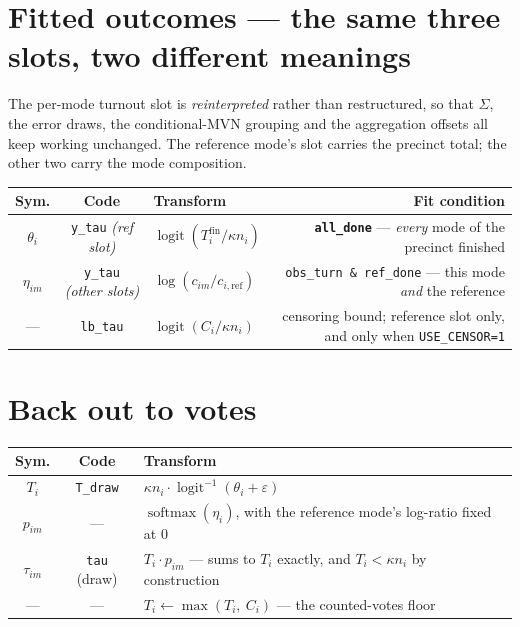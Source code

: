 \documentclass[11pt]{article}
\newcommand{\var}[1]{\texttt{\footnotesize #1}}
\newcommand{\logit}{\operatorname{logit}}
\newcommand{\softmax}{\operatorname{softmax}}
\newcommand{\refm}{\mathrm{ref}}
\begin{document}
\section{Fitted outcomes --- the same three slots, two different meanings}

The per-mode turnout slot is \emph{reinterpreted} rather than restructured, so that
$\Sigma$, the error draws, the conditional-MVN grouping and the aggregation offsets all
keep working unchanged. The reference mode's slot carries the precinct total; the other
two carry the mode composition.

\begin{center}\footnotesize
\begin{tabular}{@{}SCTR@{}}
\toprule
\textbf{Sym.} & \textbf{Code} & \textbf{Transform} & \textbf{Fit condition} \\
\midrule
$\theta_i$ & \var{y\_tau} \emph{(ref slot)} &
  $\logit\!\left(T^{\text{fin}}_i / \kappa n_i\right)$ &
  \textbf{\var{all\_done}} --- \emph{every} mode of the precinct finished \\[6pt]
$\eta_{im}$ & \var{y\_tau} \emph{(other slots)} &
  $\log\!\left(c_{im} \big/ c_{i,\refm}\right)$ &
  \var{obs\_turn \& ref\_done} --- this mode \emph{and} the reference \\[6pt]
--- & \var{lb\_tau} & $\logit\!\left(C_i / \kappa n_i\right)$ &
  censoring bound; reference slot only, and only when \var{USE\_CENSOR=1} \\
\bottomrule
\end{tabular}
\end{center}

\section{Back out to votes}

\begin{center}\footnotesize
\begin{tabular}{@{}SCT@{}}
\toprule
\textbf{Sym.} & \textbf{Code} & \textbf{Transform} \\
\midrule
$T_i$ & \var{T\_draw} & $\kappa n_i \cdot \logit^{-1}(\theta_i + \varepsilon)$ \\[4pt]
$p_{im}$ & --- & $\softmax(\eta_i)$, with the reference mode's log-ratio fixed at 0 \\[4pt]
$\tau_{im}$ & \var{tau} (draw) & $T_i \cdot p_{im}$ --- sums to $T_i$ exactly, and
  $T_i < \kappa n_i$ by construction \\[4pt]
--- & --- & $T_i \leftarrow \max(T_i,\ C_i)$ --- the counted-votes floor \\
\bottomrule
\end{tabular}
\end{center}
\end{document}
